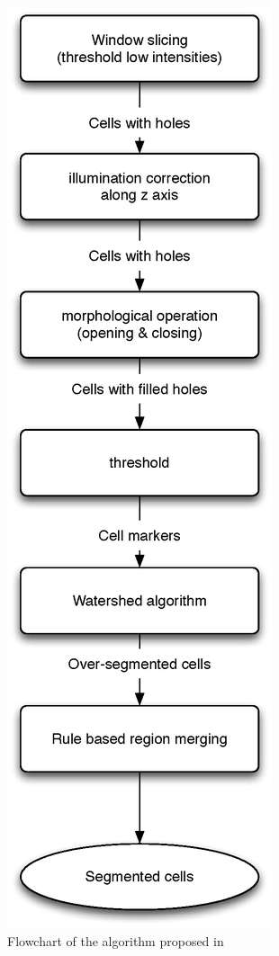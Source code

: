 \begin{figure}[h]
\begin{center}
\leavevmode
\includegraphics[height=0.87\textheight]{pictures/watershedFlowchart}
\end{center}
\caption{Flowchart of the algorithm proposed in~\cite{umesh2001efficient}}
\label{fig:watershedFlowchart}
\end{figure}

